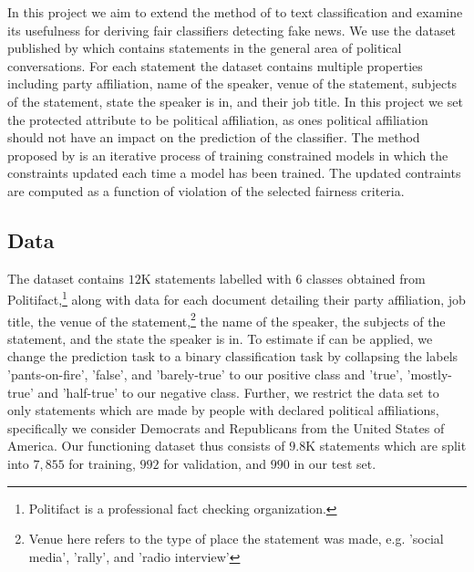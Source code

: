 In this project we aim to extend the method of \cite{Agarwal:2018} to text classification and examine its usefulness for deriving fair classifiers detecting fake news. We use the dataset published by \cite{Wang:2017} which contains statements in the general area of political conversations. For each statement the dataset contains multiple properties including party affiliation, name of the speaker, venue of the statement, subjects of the statement, state the speaker is in, and their job title. In this project we set the protected attribute to be political affiliation, as ones political affiliation should not have an impact on the prediction of the classifier. The method proposed by \cite{Agarwal:2018} is an iterative process of training constrained models in which the constraints updated each time a model has been trained. The updated contraints are computed as a function of violation of the selected fairness criteria.\vspace{5mm}

\subsection{Data}
The \cite{Wang:2017} dataset contains $12$K statements labelled with 6 classes obtained from Politifact,\footnote{Politifact is a professional fact checking organization.} along with data for each document detailing their party affiliation, job title, the venue of the statement,\footnote{Venue here refers to the type of place the statement was made, e.g. 'social media', 'rally', and 'radio interview'} the name of the speaker, the subjects of the statement, and the state the speaker is in. To estimate if \cite{Agarwal:2018} can be applied, we change the prediction task to a binary classification task by collapsing the labels 'pants-on-fire', 'false', and 'barely-true' to our positive class and 'true', 'mostly-true' and 'half-true' to our negative class. Further, we restrict the data set to only statements which are made by people with declared political affiliations, specifically we consider Democrats and Republicans from the United States of America. Our functioning dataset thus consists of $9.8$K statements which are split into $7,855$ for training, $992$ for validation, and $990$ in our test set.

